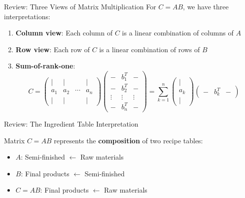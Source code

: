\documentclass[10pt]{beamer}
\theoremstyle{definition}
\newcommand{\x}[1]{\alert{\textbf{#1}}}
\begin{document}
\begin{frame}{Review: Three Views of Matrix Multiplication}
For $C = AB$, we have three interpretations:

\begin{enumerate}
\item \textbf{Column view}: Each column of $C$ is a linear combination of columns of $A$

\item \textbf{Row view}: Each row of $C$ is a linear combination of rows of $B$

\item \textbf{Sum-of-rank-one}:
$$C = 
\begin{pmatrix}
| & | & & | \\
a_1 & a_2 & \cdots & a_n \\
| & | & & |
\end{pmatrix}
\begin{pmatrix}
- & b_1^T & - \\
- & b_2^T & - \\
\vdots & \vdots & \vdots \\
- & b_n^T & -
\end{pmatrix}
 = \sum_{k=1}^{n} 
\begin{pmatrix}|\\
a_k \\
|
\end{pmatrix}
\begin{pmatrix}
- & b_k^T & -\end{pmatrix}
$$
\end{enumerate}
\end{frame}

\begin{frame}{Review: The Ingredient Table Interpretation}
\begin{center}
\end{center}

\vspace{0.3cm}
Matrix $C = AB$ represents the \x{composition} of two recipe tables:
\begin{itemize}
\item $A$: Semi-finished $\leftarrow$ Raw materials
\item $B$: Final products $\leftarrow$ Semi-finished
\item $C = AB$: Final products $\leftarrow$ Raw materials
\end{itemize}
\end{frame}
\end{document}
